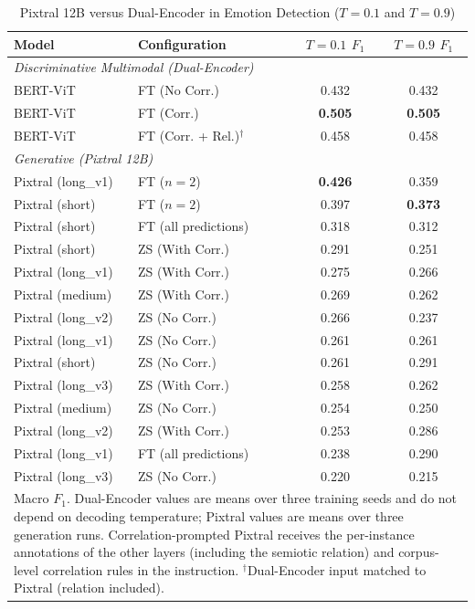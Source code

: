 \begin{table}[!t]
\centering
\caption{Pixtral 12B versus Dual-Encoder in Emotion Detection ($T=0.1$ and $T=0.9$)}
\label{tab:emotion_pixtral}
\footnotesize
\renewcommand{\arraystretch}{0.92}
\begin{tabular}{l l c c}
\hline
\textbf{Model} & \textbf{Configuration} & \textbf{$T = 0.1$ $F_1$} & \textbf{$T = 0.9$ $F_1$} \\
\hline
\multicolumn{4}{l}{\textit{Discriminative Multimodal (Dual-Encoder)}} \\
BERT-ViT & FT (No Corr.) & 0.432 & 0.432 \\
BERT-ViT & FT (Corr.) & \textbf{0.505} & \textbf{0.505} \\
BERT-ViT & FT (Corr. + Rel.)$^{\dagger}$ & 0.458 & 0.458 \\
\hline
\multicolumn{4}{l}{\textit{Generative (Pixtral 12B)}} \\
Pixtral (long\_v1) & FT ($n=2$) & \textbf{0.426} & 0.359 \\
Pixtral (short) & FT ($n=2$) & 0.397 & \textbf{0.373} \\
Pixtral (short) & FT (all predictions) & 0.318 & 0.312 \\
Pixtral (short) & ZS (With Corr.) & 0.291 & 0.251 \\
Pixtral (long\_v1) & ZS (With Corr.) & 0.275 & 0.266 \\
Pixtral (medium) & ZS (With Corr.) & 0.269 & 0.262 \\
Pixtral (long\_v2) & ZS (No Corr.) & 0.266 & 0.237 \\
Pixtral (long\_v1) & ZS (No Corr.) & 0.261 & 0.261 \\
Pixtral (short) & ZS (No Corr.) & 0.261 & 0.291 \\
Pixtral (long\_v3) & ZS (With Corr.) & 0.258 & 0.262 \\
Pixtral (medium) & ZS (No Corr.) & 0.254 & 0.250 \\
Pixtral (long\_v2) & ZS (With Corr.) & 0.253 & 0.286 \\
Pixtral (long\_v1) & FT (all predictions) & 0.238 & 0.290 \\
Pixtral (long\_v3) & ZS (No Corr.) & 0.220 & 0.215 \\
\hline
\multicolumn{4}{p{0.95\columnwidth}}{\footnotesize Macro $F_1$. Dual-Encoder values are means over three training seeds and do not depend on decoding temperature; Pixtral values are means over three generation runs. Correlation-prompted Pixtral receives the per-instance annotations of the other layers (including the semiotic relation) and corpus-level correlation rules in the instruction. $^{\dagger}$Dual-Encoder input matched to Pixtral (relation included).} \\
\end{tabular}
\end{table}

